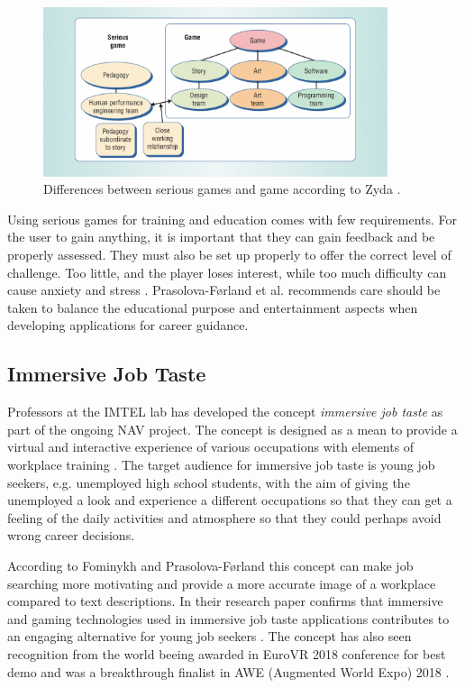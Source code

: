 \begin{figure}[!ht]
    \centering
    \includegraphics[width=0.9\textwidth]{./fig/background/seriousGames.png}
    \caption{Differences between serious games and game according to Zyda \cite{zyda2005visual}.}
    \label{fig:seriousGames}
\end{figure}

Using serious games for training and education comes with few requirements. For the user to gain anything, it is important that they can gain feedback and be properly assessed. They must also be set up properly to offer the correct level of challenge. Too little, and the player loses interest, while too much difficulty can cause anxiety and stress \cite{de2014serious}. Prasolova-Førland et al. \cite{prasolova2019empowering} recommends care should be taken to balance the educational purpose and entertainment aspects when developing applications for career guidance.

\subsection{Immersive Job Taste}
Professors at the IMTEL lab has developed the concept \textit{immersive job taste} as part of the ongoing NAV  project. The concept is designed as a mean to provide a virtual and interactive experience of various occupations with elements of workplace training \cite{fominykh2019immersive}. The target audience for immersive job taste is  young job seekers, e.g. unemployed high school students, with the aim of giving the unemployed a look and experience a different occupations so that they can get a feeling of the daily activities and atmosphere so that they could perhaps avoid wrong career decisions. 

According to Fominykh and Prasolova-Førland \cite{fominykh2019immersive} this concept can make job searching more motivating and provide a more accurate image of a workplace compared to text descriptions. In their research paper confirms that immersive and gaming technologies used in immersive job taste applications contributes to an engaging alternative for young job seekers \cite{fominykh2019immersive}. The concept has also seen recognition from the world beeing awarded in EuroVR 2018 conference for best demo \cite{euroVR} and was a breakthrough finalist in AWE (Augmented World Expo) 2018 \cite{aweAwards}.




